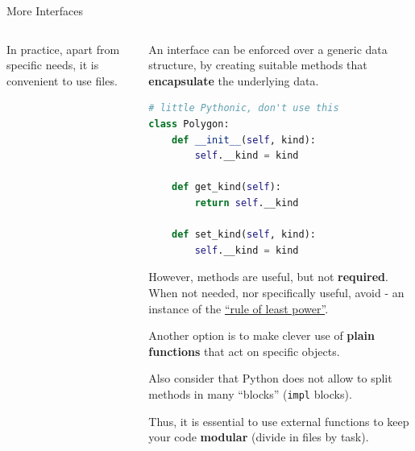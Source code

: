 \documentclass[9pt]{beamer}
\begin{document}
\begin{frame}[fragile]{More Interfaces}
\begin{columns}
\begin{column}{0.5\textwidth}
            \begin{flushright}
                \footnotesize
                In practice, apart from specific needs, it is convenient to use
                files.
            \end{flushright}
        \end{column}
        \begin{column}{0.5\textwidth}
            An interface can be enforced over a generic data structure, by
            creating suitable methods that \textbf{encapsulate} the underlying
            data.

\begin{lstlisting}[language=Python,style=mystyle]
# little Pythonic, don't use this
class Polygon:
    def __init__(self, kind):
        self.__kind = kind

    def get_kind(self):
        return self.__kind
 
    def set_kind(self, kind):
        self.__kind = kind\end{lstlisting}

            However, methods are useful, but not \textbf{required}.
            When not needed, nor specifically useful, avoid - an instance of
            the
            \href{https://en.wikipedia.org/wiki/Rule_of_least_power}{\enquote{rule
            of least power}}.\newline

            Another option is to make clever use of \textbf{plain functions}
            that act on specific objects.
            \begin{flushright}
                \footnotesize
                \hspace*{15em}Also consider that Python does not allow to split
                methods in many \enquote{blocks} (\texttt{impl} blocks).

                \hspace*{15em}Thus, it is essential to use external functions to
                keep your code \textbf{modular} (divide in files by task).
            \end{flushright}
        \end{column}
    \end{columns}
\end{frame}
\end{document}

